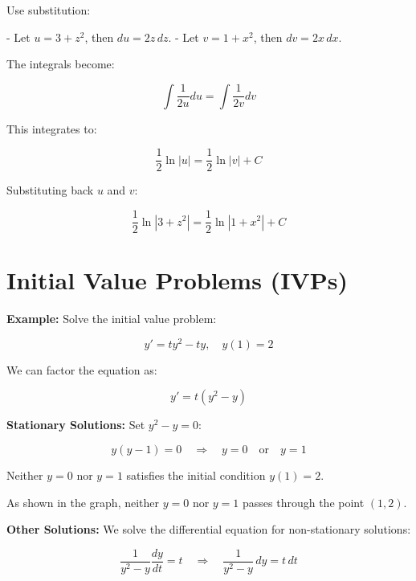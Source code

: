 \documentclass{article}
\begin{document}
Use substitution:

- Let \( u = 3 + z^2 \), then \( du = 2z \, dz \).
- Let \( v = 1 + x^2 \), then \( dv = 2x \, dx \).

The integrals become:

\[
\int \frac{1}{2u} du = \int \frac{1}{2v} dv
\]

This integrates to:

\[
\frac{1}{2} \ln|u| = \frac{1}{2} \ln|v| + C
\]

Substituting back \( u \) and \( v \):

\[
\frac{1}{2} \ln|3 + z^2| = \frac{1}{2} \ln|1 + x^2| + C
\]



\section*{Initial Value Problems (IVPs)}

\textbf{Example:} Solve the initial value problem:

\[
y' = ty^2 - ty, \quad y(1) = 2
\]

We can factor the equation as:

\[
y' = t(y^2 - y)
\]

\textbf{Stationary Solutions:}  
Set \( y^2 - y = 0 \):

\[
y(y - 1) = 0 \quad \Rightarrow \quad y = 0 \quad \text{or} \quad y = 1
\]

Neither \( y = 0 \) nor \( y = 1 \) satisfies the initial condition \( y(1) = 2 \).

\begin{center}
\end{center}

As shown in the graph, neither \( y = 0 \) nor \( y = 1 \) passes through the point \( (1, 2) \).

\textbf{Other Solutions:}  
We solve the differential equation for non-stationary solutions:

\[
\frac{1}{y^2 - y} \frac{dy}{dt} = t \quad \Rightarrow \quad \frac{1}{y^2 - y} \, dy = t \, dt
\]
\end{document}
